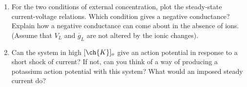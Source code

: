 \documentclass[11pt]{article}
\begin{document}
\begin{enumerate}[label=\arabic*.]
\begin{enumerate}[label=(\alph*)]
\item
For the two conditions of external  concentration, plot the steady-state current-voltage relations. Which condition gives a negative conductance? Explain how a negative conductance can come about in the absence of  ions. (Assume that $V_L$ and $\overline{g}_{L}$ are not altered by the ionic changes).
















\item
Can the system in high $[\ch{K}]_o$ give an action potential in response to a short shock of current? If not, can you think of a way of producing a potassium action potential with this system? What would an imposed steady current do?

















\end{enumerate}




\end{enumerate}
\end{document}
